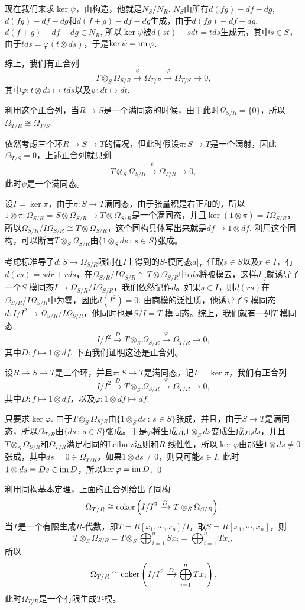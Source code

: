现在我们来求$\ker\psi$，由构造，他就是$N_S/N_R$. $N_S$由所有$d(fg)-df-dg$, $d(fg)-df-dg$和$d(f+g)-df-dg$生成，由于$d(fg)-df-dg$, $d(f+g)-df-dg\in N_R$, 所以$\ker\psi$被$d(st)-sdt=tds$生成元，其中$s\in S$，由于$tds=\varphi(t\otimes ds)$，于是$\ker\psi=\operatorname{im}\varphi$.

综上，我们有正合列
\[
	T\otimes_S \Omega_{S/R}\xrightarrow{\varphi} \Omega_{T/R}\xrightarrow{\varphi} \Omega_{T/S}\to 0,
\]
其中$\varphi:t\otimes ds\mapsto tds$以及$\psi:dt\mapsto dt$.

利用这个正合列，当$R\to S$是一个满同态的时候，由于此时$\Omega_{S/R}=\{0\}$，所以$\Omega_{T/R}\cong \Omega_{T/S}$.

\para 依然考虑三个环$R\to S\to T$的情况，但此时假设$\pi:S\to T$是一个满射，因此$\Omega_{T/S}=0$，上述正合列就只剩
\[
	T\otimes_S \Omega_{S/R}\xrightarrow{\psi} \Omega_{T/R}\to 0,
\]
此时$\psi$是一个满同态。

设$I=\ker \pi$，由于$\pi:S\to T$满同态，由于张量积是右正和的，所以$1\otimes \pi:\Omega_{S/R}=S\otimes\Omega_{S/R}\to T\otimes\Omega_{S/R}$是一个满同态，并且$\ker(1\otimes \pi)=I\Omega_{S/R}$，所以$\Omega_{S/R}/I\Omega_{S/R}\cong T\otimes\Omega_{S/R}$，这个同构具体写出来就是$df\to 1\otimes df$. 利用这个同构，可以断言$T\otimes_S\Omega_{S/R}$由$\{1\otimes_S ds\,:\,s\in S\}$张成。

考虑标准导子$d:S\to \Omega_{S/R}$限制在$I$上得到的$S$-模同态$d|_I$. 任取$s\in S$以及$r\in I$，有$d(rs)=sdr+rds$，在$\Omega_{S/R}/I\Omega_{S/R}\cong T\otimes\Omega_{S/R}$中$rds$将被模去，这样$d|_I$就诱导了一个$S$-模同态$I\to \Omega_{S/R}/I\Omega_{S/R}$，我们依然记作$d$。如果$s\in I$，则$d(rs)$在$\Omega_{S/R}/I\Omega_{S/R}$中为零，因此$d(I^2)=0$. 由商模的泛性质，他诱导了$S$-模同态$d:I/I^2\to \Omega_{S/R}/I\Omega_{S/R}$，他同时也是$S/I=T$-模同态。综上，我们就有一列$T$-模同态
\[
	I/I^2\xrightarrow{D} T\otimes_S\Omega_{S/R}\xrightarrow{\varphi} \Omega_{T/R}\to 0,
\]
其中$D:f\mapsto 1\otimes df$. 下面我们证明这还是正合列。

\pro 设$R\to S\to T$是三个环，并且$\pi:S\to T$是满同态，记$I=\ker\pi$，我们有正合列
\[
	I/I^2\xrightarrow{D} T\otimes_S\Omega_{S/R}\xrightarrow{\varphi} \Omega_{T/R}\to 0,
\]
其中$D:f\mapsto 1\otimes df$，以及$\varphi:1\otimes df\mapsto df$.

\proof
	只要求$\ker \varphi$. 由于$T\otimes_S\Omega_{S/R}$由$\{1\otimes_S ds\,:\,s\in S\}$张成，并且，由于$S\to T$是满同态，所以$\Omega_{T/R}$由$\{ds\,:\,s\in S\}$张成。于是$\varphi$将生成元$1\otimes_S ds$变成生成元$ds$，并且$T\otimes_S\Omega_{S/R}$和$\Omega_{T/R}$满足相同的Leibniz法则和$R$-线性性，所以$\ker \varphi$由那些$1\otimes ds\neq 0$张成，其中$ds=0\in\Omega_{T/R}$，如果$1\otimes ds\neq 0$，则只可能$s\in I$. 此时$1\otimes ds=Ds\in\operatorname{im} D$，所以$\ker\varphi=\operatorname{im} D$. 
\qed

利用同构基本定理，上面的正合列给出了同构
\[
	\Omega_{T/R}\cong \operatorname{coker}\left(I/I^2\xrightarrow{D} T\otimes_S\Omega_{S/R}\right).
\]
当$T$是一个有限生成$R$-代数，即$T=R[x_1,\cdots,x_n]/I$，取$S=R[x_1,\cdots,x_n]$，则
\[
	T\otimes_S\Omega_{S/R}=T\otimes_S\bigoplus_{i=1}^n Sx_i=\bigoplus_{i=1}^n Tx_i,
\]
所以
\[
	\Omega_{T/R}\cong \operatorname{coker}\left(I/I^2\xrightarrow{D} \bigoplus_{i=1}^n Tx_i\right),
\]
此时$\Omega_{T/R}$是一个有限生成$T$-模。